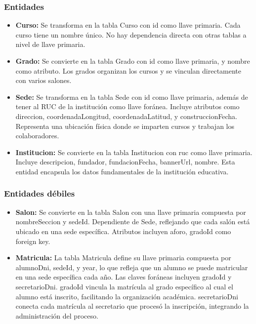 \subsubsection{Entidades}
\begin{itemize}
	\item \textbf{Curso:} Se transforma en la tabla Curso con id como llave primaria. Cada curso tiene un nombre único. No hay dependencia directa con otras tablas a nivel de llave primaria.
	\item \textbf{Grado:} Se convierte en la tabla Grado con id como llave primaria, y nombre como atributo. Los grados organizan los cursos y se vinculan directamente con varios salones.
	\item \textbf{Sede:} Se transforma en la tabla Sede con id como llave primaria, además de tener al RUC de la institución como llave foránea. Incluye atributos como direccion, coordenadaLongitud, coordenadaLatitud, y construccionFecha. Representa una ubicación física donde se imparten cursos y trabajan los colaboradores.
	\item \textbf{Institucion:} Se convierte en la tabla Institucion con ruc como llave primaria. Incluye descripcion, fundador, fundacionFecha, bannerUrl, nombre. Esta entidad encapsula los datos fundamentales de la institución educativa.
\end{itemize}
\subsubsection{Entidades débiles}
\begin{itemize}
	\item \textbf{Salon:} Se convierte en la tabla Salon con una llave primaria compuesta por nombreSeccion y sedeId. Dependiente de Sede, reflejando que cada salón está ubicado en una sede específica. Atributos incluyen aforo, gradoId como foreign key.
	\item \textbf{Matricula:} La tabla Matricula define su llave primaria compuesta por alumnoDni, sedeId, y year, lo que refleja que un alumno se puede matricular en una sede específica cada año. Las claves foráneas incluyen gradoId y secretarioDni. gradoId vincula la matrícula al grado específico al cual el alumno está inscrito, facilitando la organización académica. secretarioDni conecta cada matrícula al secretario que procesó la inscripción, integrando la administración del proceso.
\end{itemize}

